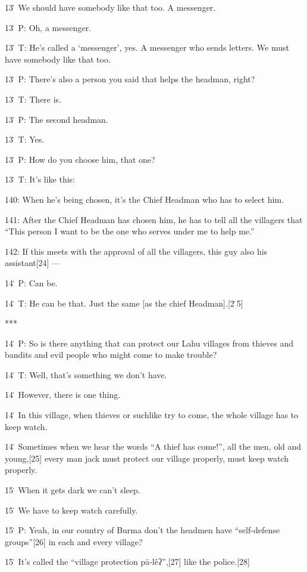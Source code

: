 {13\. We should have somebody like that too. A messenger.}

{13\. P: Oh, a messenger.}

{13\. T: He's called a `messenger', yes. A messenger who sends letters.
We must have somebody like that too.}

{13\. P: There's also a person you said that helps the headman, right?}

{13\. T: There is.}

{13\. P: The second headman.}

{13\. T: Yes.}

{13\. P: How do you choose him, that one?}

{13\. T: It's like this:}

{140: When he's being chosen, it's the Chief Headman who has to select him.}

{141: After the Chief Headman has chosen him, he has to tell all the villagers
that ``This person I want to be the one who serves under me to help me.''}

{142: If this meets with the approval of all the villagers, this guy also
his assistant[24] ---}

{14\. P: Can be.}

{14\. T: He can be that. Just the same [as the chief Headman].[2\.5]}

{***}

{14\. P: So is there anything that can protect our Lahu villages from thieves
and bandits and evil people who might come to make trouble?}

{14\. T: Well, that's something we don't have.}

{14\. However, there is one thing.}

{14\. In this village, when thieves or suchlike try to come, the whole village
has to keep watch.}

{14\. Sometimes when we hear the words ``A thief has come!'', all the men,
old and young,[25]  every man jack must protect our village properly, must keep
watch properly.}

{15\. When it gets dark we can't sleep.}

{15\. We have to keep watch carefully.}

{15\. P: Yeah, in our country of Burma don't the headmen have ``self-defense
groups''[26] in each and every village?}

{15\. It's called the ``village protection pā-lêʔ'',[27] like the police.[28]}

